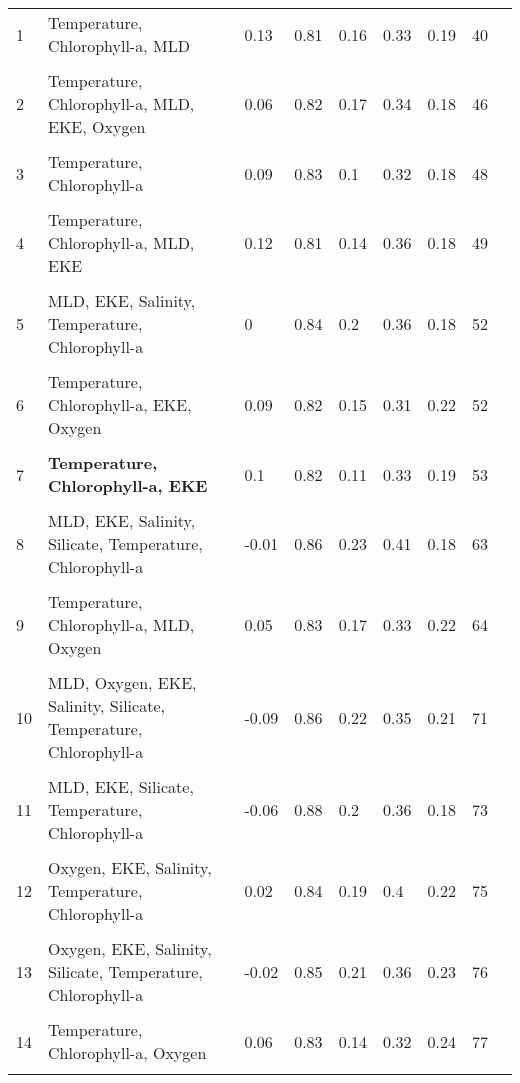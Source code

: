 \begin{table}[h]
\begin{tabularx}{\textwidth}{lXlllllll}
   
1 &
  Temperature, Chlorophyll-a, MLD &
  0.13 &
  0.81 &
  0.16 &
  0.33 &
  0.19 &
  40 \\ \\
2 &
  Temperature, Chlorophyll-a, MLD, EKE, Oxygen &
  0.06 &
  0.82 &
  0.17 &
  0.34 &
  0.18 &
  46 \\ \\
3 &
  Temperature, Chlorophyll-a &
  0.09 &
  0.83 &
  0.1 &
  0.32 &
  0.18 &
  48 \\ \\
4 &
  Temperature, Chlorophyll-a, MLD, EKE &
  0.12 &
  0.81 &
  0.14 &
  0.36 &
  0.18 &
  49 \\ \\
5 &
  MLD, EKE, Salinity, Temperature, Chlorophyll-a &
  0 &
  0.84 &
  0.2 &
  0.36 &
  0.18 &
  52 \\ \\
6 &
  Temperature, Chlorophyll-a, EKE, Oxygen &
  0.09 &
  0.82 &
  0.15 &
  0.31 &
  0.22 &
  52 \\ \\
7 &
  \textbf{Temperature, Chlorophyll-a, EKE} &
  0.1 &
  0.82 &
  0.11 &
  0.33 &
  0.19 &
  53 \\ \\
8 &
  MLD, EKE, Salinity, Silicate, Temperature, Chlorophyll-a &
  -0.01 &
  0.86 &
  0.23 &
  0.41 &
  0.18 &
  63 \\ \\
9 &
  Temperature, Chlorophyll-a, MLD, Oxygen &
  0.05 &
  0.83 &
  0.17 &
  0.33 &
  0.22 &
  64 \\ \\
10 & MLD, Oxygen, EKE, Salinity, Silicate, Temperature, Chlorophyll-a & -0.09 & 0.86 & 0.22 & 0.35 & 0.21 & 71 \\ \\
11 &
  MLD, EKE, Silicate, Temperature, Chlorophyll-a &
  -0.06 &
  0.88 &
  0.2 &
  0.36 &
  0.18 &
  73 \\ \\
12 &
  Oxygen, EKE, Salinity, Temperature, Chlorophyll-a &
  0.02 &
  0.84 &
  0.19 &
  0.4 &
  0.22 &
  75 \\ \\
13 &
  Oxygen, EKE, Salinity, Silicate, Temperature, Chlorophyll-a &
  -0.02 &
  0.85 &
  0.21 &
  0.36 &
  0.23 &
  76 \\ \\
14 &
  Temperature, Chlorophyll-a, Oxygen &
  0.06 &
  0.83 &
  0.14 &
  0.32 &
  0.24 &
  77 \\ \\

\end{tabularx}
\end{table}
